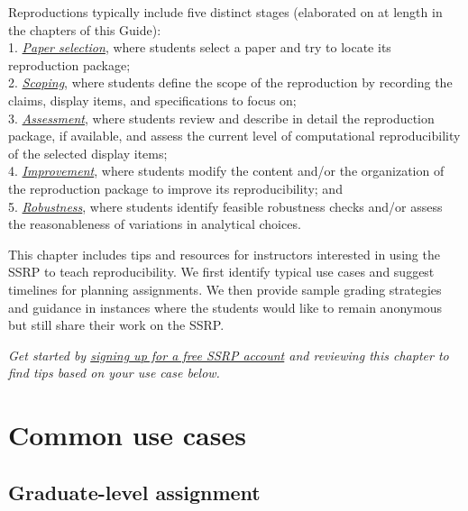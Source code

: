 \documentclass[
]{book}
\begin{document}
Reproductions typically include five distinct stages (elaborated on at length in the chapters of this Guide):\\
1. \emph{\href{https://bitss.github.io/ACRE/select.html\#select}{Paper selection}}, where students select a paper and try to locate its reproduction package;\\
2. \emph{\href{https://bitss.github.io/ACRE/scoping.html\#scoping}{Scoping}}, where students define the scope of the reproduction by recording the claims, display items, and specifications to focus on;\\
3. \emph{\href{https://bitss.github.io/ACRE/assessment.html\#assessment}{Assessment}}, where students review and describe in detail the reproduction package, if available, and assess the current level of computational reproducibility of the selected display items;\\
4. \emph{\href{https://bitss.github.io/ACRE/improvements.html\#improvements}{Improvement}}, where students modify the content and/or the organization of the reproduction package to improve its reproducibility; and\\
5. \emph{\href{https://bitss.github.io/ACRE/robust.html\#robust}{Robustness}}, where students identify feasible robustness checks and/or assess the reasonableness of variations in analytical choices.

This chapter includes tips and resources for instructors interested in using the SSRP to teach reproducibility. We first identify typical use cases and suggest timelines for planning assignments. We then provide sample grading strategies and guidance in instances where the students would like to remain anonymous but still share their work on the SSRP.

\emph{Get started by \href{https://www.socialsciencereproduction.org/users/sign_in}{signing up for a free SSRP account} and reviewing this chapter to find tips based on your use case below.}

\hypertarget{common-use-cases}{%
\section{Common use cases}\label{common-use-cases}}

\hypertarget{graduate-level-assignment}{%
\subsection{Graduate-level assignment}\label{graduate-level-assignment}}
\end{document}
